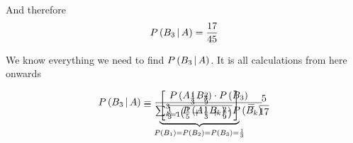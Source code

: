 \documentclass[14pt,fleqn]{extarticle}
\begin{document}
\begin{question}
\begin{step}
\begin{options}
            And therefore 
       \[ P\left(B_3\,\vert\,A\right) = \frac{17}{45} \]
        
    \end{options} 
     \reason 
       
     We know everything we need to find $P\left(B_3\,\vert\,A\right)$. It is all 
     calculations from here onwards
     
     \begin{align}
	P\left(B_3\,\vert\,A\right) &= \dfrac{P\left(A\,\vert\,B_3\right)\cdot P\left( B_3\right)}{\sum_{k=1}^3 P\left(A\,\vert\,B_k\right)\cdot P\left( B_k\right)} \\[-30pt]
	&= \underbrace{\left[\dfrac{\frac{1}{3}\cdot \frac{2}{9}}{\frac{1}{3}\cdot \left(\frac{1}{5}+\frac{1}{3}+\frac{2}{9} \right)} \right]}_{P\left( B_1\right)=P\left( B_2\right) = P\left( B_3\right) = \frac{1}{3}} = \frac{5}{17}
\end{align}  
\end{step}

\end{question} 
\end{document}

